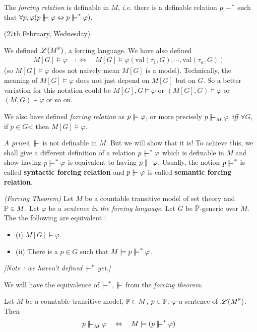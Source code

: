 \documentclass[12pt,a4paper]{article}
\renewenvironment{i}
{\begin{itemize} 
	}%
	{\end{itemize}
}
\begin{document}
\thm The \emph{forcing relation} is definable in $M$, \textit{i.e.} there is a definable relation $p\forces^*$ such that $\forall p, \varphi (p\forces \varphi \Leftrightarrow p\forces^* \varphi)$.
\s

\newday

(27th February, Wednesday)
\s

We defined $\mathscr{L}(M^{\mathbb{P}})$, a forcing language. We have also defined
\begin{align*}
M[G] \models \varphi \quad :\Leftrightarrow \quad M[G] \models \varphi( \text{val}(\tau_1, G), \cdots, \text{val}(\tau_n, G))
\end{align*}
(so $M[G] \models \varphi$ does not naively mean $M[G]$ is a model). Technically, the meaning of $M[G] \models \varphi$ does not just depend on $M[G]$ but on $G$. So a better variation for this notation could be $M[G], G \models \varphi$ or $(M[G], G)\models \varphi$ or $(M, G) \models \varphi$ or so on.

\quad We also have defined \emph{forcing relation} as $p\forces \varphi$, or more precisely $p\forces_M\varphi$ \emph{iff} $\forall G$, if $p\in G$< then $M[G] \models \varphi$.

\quad \textit{A priori}, $\forces$ is not definable in $M$. But we will show that it is! To achieve this, we shall give a different definition of a relation $p\forces^* \varphi$ which is definable in $M$ and show having $p\forces^* \varphi$ is equivalent to having $p \forces \varphi$. Usually, the notion $p\forces^*$ is called \textbf{syntactic forcing relation} and $p\forces \varphi$ is called \textbf{semantic forcing relation}.
\s

\thm \emph{(Forcing Theorem)} Let $M$ be a countable transitive model of set theory and $\mathbb{P} \in M$. Let $\varphi$ be a \emph{sentence in the forcing language}. Let $G$ be $\mathbb{P}$-generic over $M$. The the following are equivalent :
\begin{i}
\item[(i)] $M[G] \models \varphi$.
\item[(ii)] There is a $p\in G$ such that $M\models p \forces^* \varphi$.
\end{i}
\emph{[Note : we haven't defined $\forces^*$ yet.]}
\s

We will have the equivalence of $\forces^*$, $\forces$ from the \emph{forcing theorem}.
\s

\prop Let $M$ be a countable transitive model, $\mathbb{P} \in M$, $p\in \mathbb{P}$, $\varphi$ a sentence of $\mathscr{L}(M^{\mathbb{P}})$. Then
\begin{align*}
p\forces_M \varphi \quad \Leftrightarrow \quad M \models (p\forces^* \varphi)
\end{align*}
\s
\end{document}
